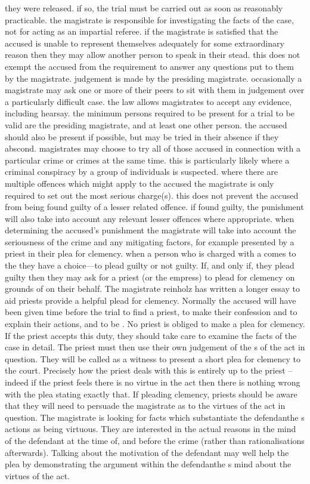 they were released. if so, the trial must be carried out as soon as reasonably practicable. the magistrate is responsible for investigating the facts of the case, not for acting as an impartial referee. if the magistrate is satisfied that the accused is unable to represent themselves adequately for some extraordinary reason then they may allow another person to speak in their stead. this does not exempt the accused from the requirement to answer any questions put to them by the magistrate. judgement is made by the presiding magistrate. occasionally a magistrate may ask one or more of their peers to sit with them in judgement over a particularly difficult case. the law allows magistrates to accept any evidence, including hearsay. the minimum persons required to be present for a trial to be valid are the presiding magistrate, and at least one other person. the accused should also be present if possible, but may be tried in their absence if they abscond. magistrates may choose to try all of those accused in connection with a particular crime or crimes at the same time. this is particularly likely where a criminal conspiracy by a group of individuals is suspected. where there are multiple offences which might apply to the accused the magistrate is only required to set out the most serious charge(s). this does not prevent the accused from being found guilty of a lesser related offence. if found guilty, the punishment will also take into account any relevant lesser offences where appropriate. when determining the accused's punishment the magistrate will take into account the seriousness of the crime and any mitigating factors, for example presented by a priest in their plea for clemency. \localpar {} when a person who is charged with a  comes to the  they have a choice—to plead guilty or not guilty. If, and only if, they plead guilty then they may ask for a priest (or the empress) to plead for clemency on grounds of  on their behalf. The magistrate reinholz has written a longer essay to aid priests provide a helpful plead for clemency. Normally the accused will have been given time before the trial to find a priest, to make their confession and to explain their actions, and to be . No priest is obliged to make a plea for clemency. If the priest accepts this duty, they should take care to examine the facts of the case in detail. The priest must then use their own judgement of the s of the act in question. They will be called as a witness to present a short plea for clemency to the court. Precisely how the priest deals with this is entirely up to the priest – indeed if the priest feels there is no virtue in the act then there is nothing wrong with the plea stating exactly that. If pleading clemency, priests should be aware that they will need to persuade the magistrate as to the virtues of the act in question. The magistrate is looking for facts which substantiate the defendanthe s actions as being virtuous. They are interested in the actual reasons in the mind of the defendant at the time of, and before the crime (rather than rationalisations afterwards). Talking about the motivation of the defendant may well help the plea by demonstrating the argument within the defendanthe s mind about the virtues of the act. 